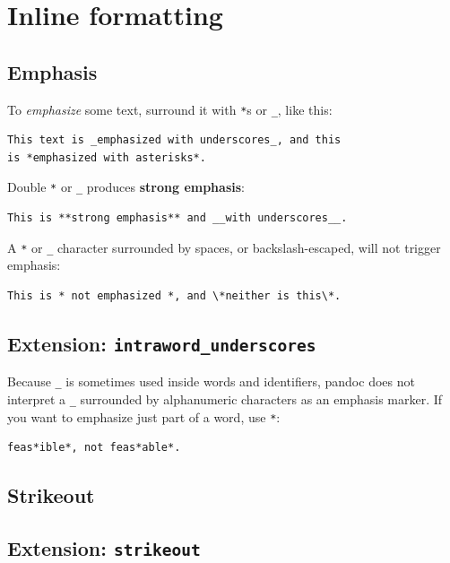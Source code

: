 \documentclass[
  b5paper
]{book}
\begin{document}
\section{Inline formatting}\label{inline-formatting}

\subsection{Emphasis}\label{emphasis}

To \emph{emphasize} some text, surround it with \texttt{*}s or
\texttt{\_}, like this:

\begin{verbatim}
This text is _emphasized with underscores_, and this
is *emphasized with asterisks*.
\end{verbatim}

Double \texttt{*} or \texttt{\_} produces \textbf{strong emphasis}:

\begin{verbatim}
This is **strong emphasis** and __with underscores__.
\end{verbatim}

A \texttt{*} or \texttt{\_} character surrounded by spaces, or
backslash-escaped, will not trigger emphasis:

\begin{verbatim}
This is * not emphasized *, and \*neither is this\*.
\end{verbatim}

\subsection{\texorpdfstring{Extension:
\texttt{intraword\_underscores}}{Extension: intraword\_underscores}}\label{extension-intraword_underscores}

Because \texttt{\_} is sometimes used inside words and identifiers,
pandoc does not interpret a \texttt{\_} surrounded by alphanumeric
characters as an emphasis marker. If you want to emphasize just part of
a word, use \texttt{*}:

\begin{verbatim}
feas*ible*, not feas*able*.
\end{verbatim}

\subsection{Strikeout}\label{strikeout}

\subsection{\texorpdfstring{Extension:
\texttt{strikeout}}{Extension: strikeout}}\label{extension-strikeout}
\end{document}
